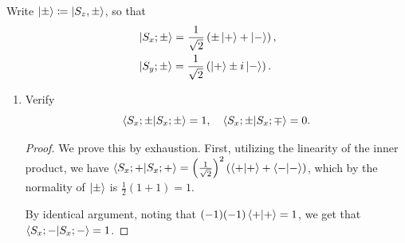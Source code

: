 \documentclass[12pt]{article}
\newenvironment{problem}[2][Problem]{\begin{trivlist}
    \item[\hskip \labelsep {\bfseries #1}\hskip \labelsep {\bfseries #2.}]}{\end{trivlist}}
\theoremstyle{definition}
\begin{document}
\begin{problem}{3}
  Write \( \ket{\pm} \coloneq \ket{S_z, \pm} \), so that
  \begin{align*}
  \label{eq:1}
    &\ket{S_x; \pm} = \frac{1}{\sqrt{2}}\left( \pm \ket{+} + \ket{-} \right),\\
    &\ket{S_y; \pm} = \frac{1}{\sqrt{2}}\left( \ket{+} \pm i\ket{-} \right).
  \end{align*}

  \begin{enumerate}[label=(\alph*)]
    \item Verify
          \begin{equation}
          \label{eq:2}
          \braket{S_x; \pm}{S_x; \pm} = 1, \quad \braket{S_x; \pm}{S_x; \mp} = 0.
          \end{equation}
          \begin{proof}
            We prove this by exhaustion.
            First, utilizing the linearity of the inner product, we have \( \ip{S_x; +} = \left(\frac{1}{\sqrt{2}}\right)^2 \left( \ip{+} + \ip{-} \right) \), which by the normality of \( \ket{\pm} \) is \( \frac{1}{2} \left( 1 + 1 \right) = 1 \).

            By identical argument, noting that \( (-1)(-1)\ip{+} = 1 \), we get that \( \ip{S_x; -} = 1 \).


\end{proof}
\end{enumerate}
\end{problem}
\end{document}
